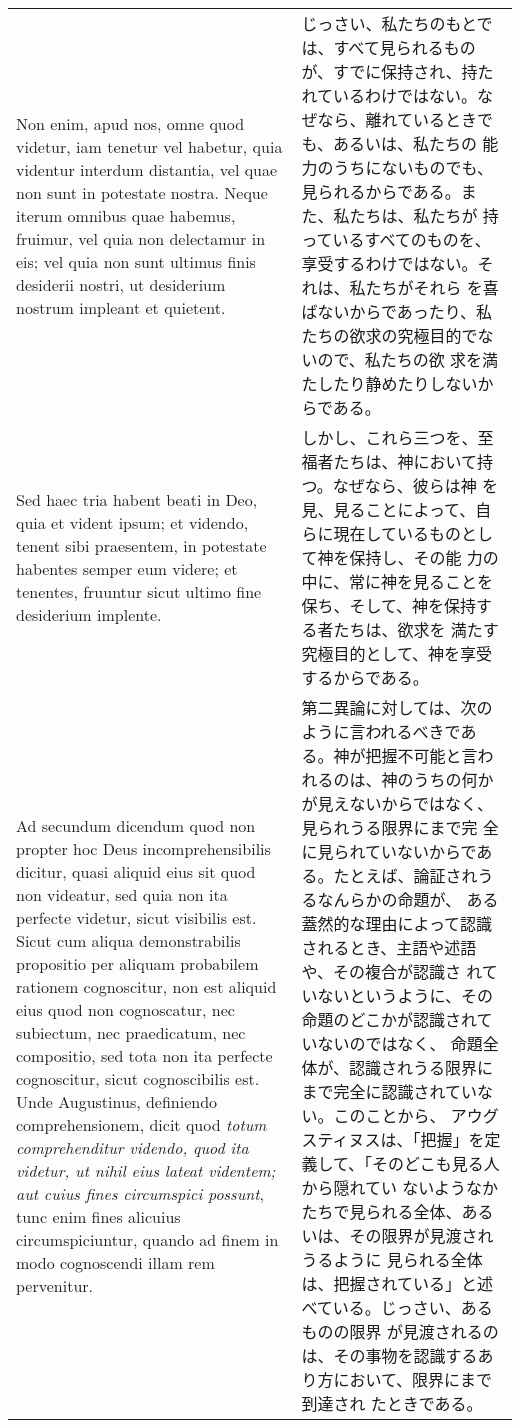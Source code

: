 \documentclass[10pt]{jsarticle} %
\begin{document}
\begin{longtable}{p{21em}p{21em}}
Non enim, apud nos, omne quod videtur, iam tenetur vel habetur, quia
videntur interdum distantia, vel quae non sunt in potestate
nostra. Neque iterum omnibus quae habemus, fruimur, vel quia non
delectamur in eis; vel quia non sunt ultimus finis desiderii nostri,
ut desiderium nostrum impleant et quietent.

&

じっさい、私たちのもとでは、すべて見られるものが、すでに保持され、持た
れているわけではない。なぜなら、離れているときでも、あるいは、私たちの
能力のうちにないものでも、見られるからである。また、私たちは、私たちが
持っているすべてのものを、享受するわけではない。それは、私たちがそれら
を喜ばないからであったり、私たちの欲求の究極目的でないので、私たちの欲
求を満たしたり静めたりしないからである。

\\

Sed haec tria habent beati in Deo, quia et vident ipsum; et videndo,
tenent sibi praesentem, in potestate habentes semper eum videre; et
tenentes, fruuntur sicut ultimo fine desiderium implente.

&

しかし、これら三つを、至福者たちは、神において持つ。なぜなら、彼らは神
を見、見ることによって、自らに現在しているものとして神を保持し、その能
力の中に、常に神を見ることを保ち、そして、神を保持する者たちは、欲求を
満たす究極目的として、神を享受するからである。

\\

{\sc Ad secundum dicendum} quod non propter hoc Deus
incomprehensibilis dicitur, quasi aliquid eius sit quod non videatur,
sed quia non ita perfecte videtur, sicut visibilis est. Sicut cum
aliqua demonstrabilis propositio per aliquam probabilem rationem
cognoscitur, non est aliquid eius quod non cognoscatur, nec subiectum,
nec praedicatum, nec compositio, sed tota non ita perfecte
cognoscitur, sicut cognoscibilis est. Unde Augustinus, definiendo
comprehensionem, dicit quod {\it totum comprehenditur videndo, quod
ita videtur, ut nihil eius lateat videntem; aut cuius fines
circumspici possunt}, tunc enim fines alicuius circumspiciuntur,
quando ad finem in modo cognoscendi illam rem pervenitur.

&

第二異論に対しては、次のように言われるべきである。神が把握不可能と言わ
れるのは、神のうちの何かが見えないからではなく、見られうる限界にまで完
全に見られていないからである。たとえば、論証されうるなんらかの命題が、
ある蓋然的な理由によって認識されるとき、主語や述語や、その複合が認識さ
れていないというように、その命題のどこかが認識されていないのではなく、
命題全体が、認識されうる限界にまで完全に認識されていない。このことから、
アウグスティヌスは、「把握」を定義して、「そのどこも見る人から隠れてい
ないようなかたちで見られる全体、あるいは、その限界が見渡されうるように
見られる全体は、把握されている」と述べている。じっさい、あるものの限界
が見渡されるのは、その事物を認識するあり方において、限界にまで到達され
たときである。



\end{longtable}
\end{document}

